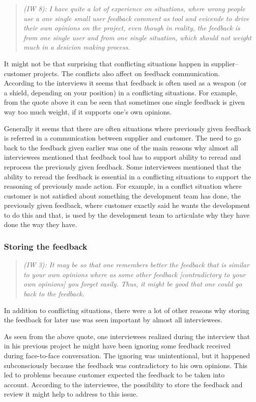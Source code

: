 \documentclass[english,12pt,a4paper,pdftex]{article}
\newcommand{\q}[2]{
\begin{quote}
\emph{(IW #1): #2}
\end{quote}}
\begin{document}
\q{8}{I have quite a lot of experience on situations, where wrong people use a one single small user feedback comment as tool and evicende to drive their own opinions on the project, even though in reality, the feedback is from one single user and from one single situation, which should not weight much in a desicion making process.}

It might not be that surprising that conflicting situations happen in supplier--customer projects. The conflicts also affect on feedback communication. According to the interviews it seems that feedback is often used as a weapon (or a shield, depending on your position) in a conflicting situations. For example, from the quote above it can be seen that sometimes one single feedback is given way too much weight, if it supports one's own opinions.

Generally it seems that there are often situations where previously given feedback is referred in a communication between supplier and customer. The need to go back to the feedback given earlier was one of the main reasons why almost all interviewees mentioned that feedback tool has to support ability to reread and reprocess the previously given feedback. Some interviewees mentioned that the ability to reread the feedback is essential in a conflicting situations to support the reasoning of previously made action. For example, in a conflict situation where customer is not satisfied about something the development team has done, the previously given feedback, where customer exactly said he wants the development to do this and that, is used by the development team to articulate why they have done the way they have.

\subsubsection{Storing the feedback}

\q{3}{It may be so that one remembers better the feedback that is similar to your own opinions where as some other feedback [contradictory to your own opinions] you forget easily. Thus, it might be good that one could go back to the feedback.}

In addition to conflicting situations, there were a lot of other reasons why storing the feedback for later use was seen important by almost all interviewees.

As seen from the above quote, one interviewees realized during the interview that in his previous project he might have been ignoring some feedback received during face-to-face conversation. The ignoring was unintentional, but it happened subconsciously because the feedback was contradictory to his own opinions. This led to problems because customer expected the feedback to be taken into account. According to the interviewee, the possibility to store the feedback and review it might help to address to this issue.
\end{document}
